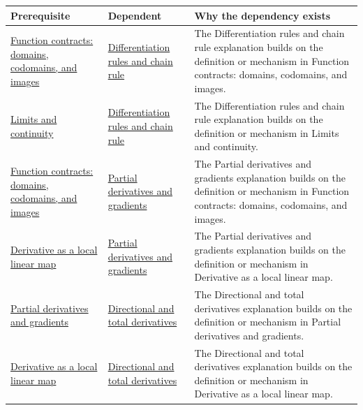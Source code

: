 {\def\LTcaptype{none} %
\begin{longtable}[]{@{}
  >{\raggedright\arraybackslash}p{}
  >{\raggedright\arraybackslash}p{}
  >{\raggedright\arraybackslash}p{}@{}}
\toprule\noalign{}
\begin{minipage}[b]{\linewidth}\raggedright
Prerequisite
\end{minipage} & \begin{minipage}[b]{\linewidth}\raggedright
Dependent
\end{minipage} & \begin{minipage}[b]{\linewidth}\raggedright
Why the dependency exists
\end{minipage} \\
\midrule\noalign{}
\endhead
\bottomrule\noalign{}
\endlastfoot
\hyperref[appendix-a59658325cd6]{Function contracts: domains, codomains, and images} & \hyperref[appendix-d9f70bdfbc92]{Differentiation rules and chain rule} & The Differentiation rules and chain rule explanation builds on the definition or mechanism in Function contracts: domains, codomains, and images. \\
\hyperref[appendix-fecc1847f5a3]{Limits and continuity} & \hyperref[appendix-d9f70bdfbc92]{Differentiation rules and chain rule} & The Differentiation rules and chain rule explanation builds on the definition or mechanism in Limits and continuity. \\
\hyperref[appendix-a59658325cd6]{Function contracts: domains, codomains, and images} & \hyperref[appendix-677b59746ae0]{Partial derivatives and gradients} & The Partial derivatives and gradients explanation builds on the definition or mechanism in Function contracts: domains, codomains, and images. \\
\hyperref[appendix-7bc181935c42]{Derivative as a local linear map} & \hyperref[appendix-677b59746ae0]{Partial derivatives and gradients} & The Partial derivatives and gradients explanation builds on the definition or mechanism in Derivative as a local linear map. \\
\hyperref[appendix-677b59746ae0]{Partial derivatives and gradients} & \hyperref[appendix-e2d476574aab]{Directional and total derivatives} & The Directional and total derivatives explanation builds on the definition or mechanism in Partial derivatives and gradients. \\
\hyperref[appendix-7bc181935c42]{Derivative as a local linear map} & \hyperref[appendix-e2d476574aab]{Directional and total derivatives} & The Directional and total derivatives explanation builds on the definition or mechanism in Derivative as a local linear map. \\

\end{longtable}}
